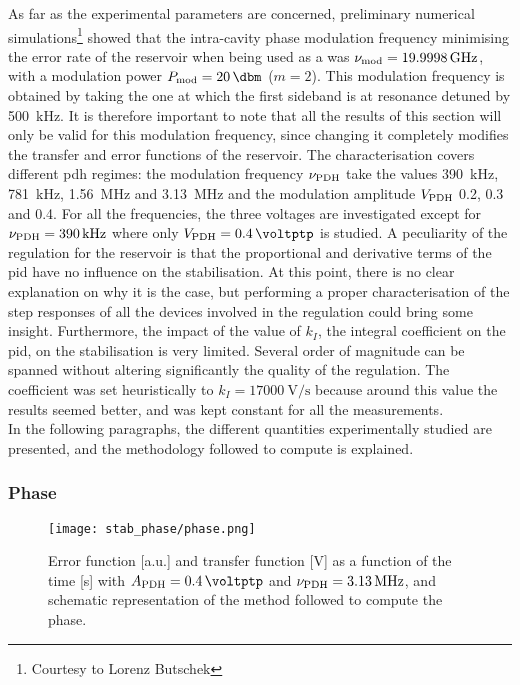As far as the experimental parameters are concerned, preliminary numerical simulations\footnote{Courtesy to Lorenz Butschek} showed that the intra-cavity phase modulation frequency minimising the error rate of the reservoir when being used as a \rcer was $\nu_{\text{mod}} = \SI{19.9998}{\giga\hertz}$, with a modulation power $\tind{P}{mod} = \SI{20}{\dbm}$ ($m=2$). This modulation frequency is obtained by taking the one at which the first sideband is at resonance detuned by \SI{500}{\kilo\hertz}. It is therefore important to note that all the results of this section will only be valid for this modulation frequency, since changing it completely modifies the transfer and error functions of the reservoir. The characterisation covers different \gls{pdh} regimes: the modulation frequency $\nu_{\text{PDH}}$ take the values \SI{390}{\kilo\hertz}, \SI{781}{\kilo\hertz}, \SI{1.56}{\mega\hertz} and \SI{3.13}{\mega\hertz} and the modulation amplitude $V_{\text{PDH}}$ \SI{0.2}{\voltptp}, \SI{0.3}{\voltptp} and \SI{0.4}{\voltptp}. For all the frequencies, the three voltages are investigated except for $\nu_{\text{PDH}} = \SI{390}{\kilo\hertz}$ where only $\tind{V}{PDH} = \SI{0.4}{\voltptp}$ is studied. A peculiarity of the regulation for the reservoir is that the proportional and derivative terms of the \gls{pid} have no influence on the stabilisation. At this point, there is no clear explanation on why it is the case, but performing a proper characterisation of the step responses of all the devices involved in the regulation could bring some insight. Furthermore, the impact of the value of $k_I$, the integral coefficient on the \gls{pid}, on the stabilisation is very limited. Several order of magnitude can be spanned without altering significantly the quality of the regulation. The coefficient was set heuristically to $k_I=\SI{17000}{\volt\per\second}$ because around this value the results seemed better, and was kept constant for all the measurements.\\

In the following paragraphs, the different quantities experimentally studied are presented, and the methodology followed to compute is explained.


\subsubsection{Phase}

\begin{figure}[h]
	\centering
	\texttt{[image: stab\_phase/phase.png]}
	\caption{Error function [a.u.] and transfer function [\si{\volt}] as a function of the time [\si{\second}] with $\tind{A}{PDH} = \SI{0.4}{\voltptp}$ and $\nu_{\text{PDH}} = \SI{3.13}{\mega\hertz}$, and schematic representation of the method followed to compute the phase.}
	\label{phase}
\end{figure}

